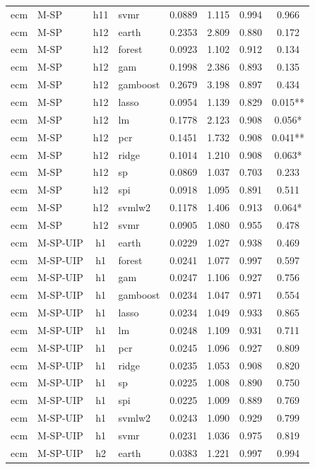 \begin{ThreePartTable}
\begin{longtable}[t]{llclcccc}
ecm & M-SP & h11 & svmr & 0.0889 & 1.115 & 0.994 & 0.966\\
\addlinespace
ecm & M-SP & h12 & earth & 0.2353 & 2.809 & 0.880 & 0.172\\
ecm & M-SP & h12 & forest & 0.0923 & 1.102 & 0.912 & 0.134\\
ecm & M-SP & h12 & gam & 0.1998 & 2.386 & 0.893 & 0.135\\
ecm & M-SP & h12 & gamboost & 0.2679 & 3.198 & 0.897 & 0.434\\
ecm & M-SP & h12 & lasso & 0.0954 & 1.139 & 0.829 & 0.015**\\
ecm & M-SP & h12 & lm & 0.1778 & 2.123 & 0.908 & 0.056*\\
ecm & M-SP & h12 & pcr & 0.1451 & 1.732 & 0.908 & 0.041**\\
ecm & M-SP & h12 & ridge & 0.1014 & 1.210 & 0.908 & 0.063*\\
ecm & M-SP & h12 & sp & 0.0869 & 1.037 & 0.703 & 0.233\\
ecm & M-SP & h12 & spi & 0.0918 & 1.095 & 0.891 & 0.511\\
ecm & M-SP & h12 & svmlw2 & 0.1178 & 1.406 & 0.913 & 0.064*\\
ecm & M-SP & h12 & svmr & 0.0905 & 1.080 & 0.955 & 0.478\\
\addlinespace
ecm & M-SP-UIP & h1 & earth & 0.0229 & 1.027 & 0.938 & 0.469\\
ecm & M-SP-UIP & h1 & forest & 0.0241 & 1.077 & 0.997 & 0.597\\
ecm & M-SP-UIP & h1 & gam & 0.0247 & 1.106 & 0.927 & 0.756\\
ecm & M-SP-UIP & h1 & gamboost & 0.0234 & 1.047 & 0.971 & 0.554\\
ecm & M-SP-UIP & h1 & lasso & 0.0234 & 1.049 & 0.933 & 0.865\\
ecm & M-SP-UIP & h1 & lm & 0.0248 & 1.109 & 0.931 & 0.711\\
ecm & M-SP-UIP & h1 & pcr & 0.0245 & 1.096 & 0.927 & 0.809\\
ecm & M-SP-UIP & h1 & ridge & 0.0235 & 1.053 & 0.908 & 0.820\\
ecm & M-SP-UIP & h1 & sp & 0.0225 & 1.008 & 0.890 & 0.750\\
ecm & M-SP-UIP & h1 & spi & 0.0225 & 1.009 & 0.889 & 0.769\\
ecm & M-SP-UIP & h1 & svmlw2 & 0.0243 & 1.090 & 0.929 & 0.799\\
ecm & M-SP-UIP & h1 & svmr & 0.0231 & 1.036 & 0.975 & 0.819\\
\addlinespace
ecm & M-SP-UIP & h2 & earth & 0.0383 & 1.221 & 0.997 & 0.994\\

\end{longtable}
\end{ThreePartTable}
